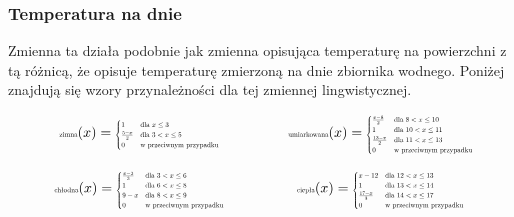 \documentclass{article}
\begin{document}
\subsubsection{Temperatura na dnie}

\noindent Zmienna ta działa podobnie jak zmienna opisująca temperaturę na powierzchni z tą różnicą, że opisuje temperaturę zmierzoną na dnie zbiornika wodnego. Poniżej znajdują się wzory przynależności dla tej zmiennej lingwistycznej.

\begin{equation*}
\begin{minipage}{0.5\textwidth}
\centering
$\text{\scalebox{0.5}{zimna}}(x) =
\scalebox{0.5}{$
\begin{cases}
1 & \text{dla } x \leq 3 \\
\frac{5 - x}{2} & \text{dla } 3 < x \leq 5 \\
0 & \text{w przeciwnym przypadku}
\end{cases}
$}$
\end{minipage}%
\begin{minipage}{0.5\textwidth}
\centering
$\text{\scalebox{0.5}{umiarkowana}}(x) =
\scalebox{0.5}{$
\begin{cases}
\frac{x - 8}{2} & \text{dla } 8 < x \leq 10 \\
1 & \text{dla } 10 < x \leq 11 \\
\frac{13 - x}{2} & \text{dla } 11 < x \leq 13 \\
0 & \text{w przeciwnym przypadku}
\end{cases}
$}$
\end{minipage}
\end{equation*}

\begin{equation*}
\begin{minipage}{0.5\textwidth}
\centering
$\text{\scalebox{0.5}{chłodna}}(x) =
\scalebox{0.5}{$
\begin{cases}
\frac{x - 3}{3} & \text{dla } 3 < x \leq 6 \\
1 & \text{dla } 6 < x \leq 8 \\
9 - x & \text{dla } 8 < x \leq 9 \\
0 & \text{w przeciwnym przypadku}
\end{cases}
$}$
\end{minipage}%
\begin{minipage}{0.5\textwidth}
\centering
$\text{\scalebox{0.5}{ciepła}}(x) =
\scalebox{0.5}{$
\begin{cases}
x - 12 & \text{dla } 12 < x \leq 13 \\
1 & \text{dla } 13 < x \leq 14 \\
\frac{17 - x}{3} & \text{dla } 14 < x \leq 17 \\
0 & \text{w przeciwnym przypadku}
\end{cases}
$}$
\end{minipage}
\end{equation*}
\end{document}
